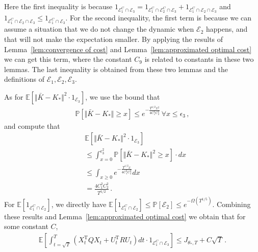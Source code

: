 \documentclass{article}
\theoremstyle{definition}
\begin{document}
Here the first inequality is because $1_{\mathcal{E}^{C}_{1}\cap \mathcal{E}_{3}}=1_{\mathcal{E}^{C}_{1}\cap \mathcal{E}^{C}_{2}\cap\mathcal{E}_{3}}+1_{\mathcal{E}^{C}_{1}\cap \mathcal{E}_{2}\cap\mathcal{E}_{3}}$ and
$1_{\mathcal{E}^{C}_{1}\cap \mathcal{E}_{2}\cap\mathcal{E}_{3}}\leq 1_{\mathcal{E}^{C}_{1}\cap\mathcal{E}_{3}}$. For the second inequality, the first term is because we can assume a situation that we do not change the dynamic when $\mathcal{E}_{2}$ happens, and that will not make the expectation smaller. By applying the results of Lemma~\ref{lem:convergence of cost} and Lemma~\ref{lem:approximated optimal cost} we can get this term, where the constant $C_{9}$ is related to constants in these two lemmas. The last inequality is obtained from these two lemmas and the definitions of $\mathcal{E}_{1},\mathcal{E}_{2},\mathcal{E}_{3}$.

As for $\mathbb{E}\left[\Vert \bar{K}-K_{*}\Vert^{2}\cdot 1_{\mathcal{E}_{3}}\right]$, we use the bound that
\begin{align*}
\mathbb{P}\left[\Vert \bar{K}-K_{*}\Vert\geq x\right]\leq e^{-\frac{T^{1/2}x^{2}}{4C_{1}^{2}C_{2}^{2}}}\,\forall x\leq\epsilon_{3}\,,
\end{align*}
and compute that
\begin{align*}
&\mathbb{E}\left[\Vert \bar{K}-K_{*}\Vert^{2}\cdot 1_{\mathcal{E}_{3}}\right]\\
&\leq \int_{x=0}^{\epsilon_{3}^{2}}\mathbb{P}\left[\Vert \bar{K}-K_{*}\Vert^{2}\geq x\right]\cdot dx\\
&\leq \int_{x\geq 0}e^{-\frac{T^{1/2}x}{4C_{1}^{2}C_{2}^{2}}}dx\\
&=\frac{4C_{1}^{2}C^{2}_{2}}{T^{1/2}}\,.
\end{align*}
For $\mathbb{E}\left[1_{\mathcal{E}^{C}_{1}\cap \mathcal{E}_{2}}\right]$, we directly have $\mathbb{E}\left[1_{\mathcal{E}^{C}_{1}\cap \mathcal{E}_{2}}\right]\leq \mathbb{P}\left[\mathcal{E}_{2}\right]\leq e^{-\Omega(T^{1/5})}$.
Combining these results and Lemma~\ref{lem:approximated optimal cost} we obtain that for some constant $C$,
\begin{align*}
\mathbb{E}\left[\int_{t=\sqrt{T}}^{T}\left(X^{\mathrm{T}}_{t}QX_{t}+U^{\mathrm{T}}_{t}RU_{t}\right)dt\cdot 1_{\mathcal{E}^{C}_{1}\cap \mathcal{E}_{3}}\right]\leq J_{\theta_{*},T}+C\sqrt{T}\,.
\end{align*}
\end{document}
